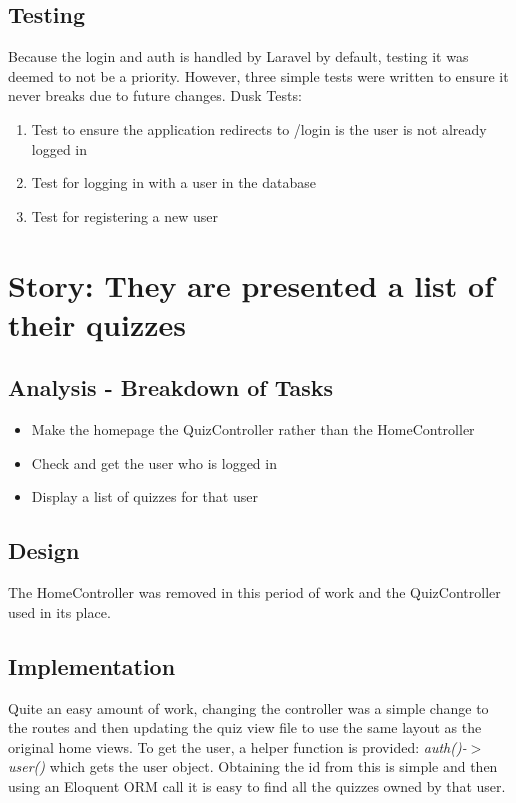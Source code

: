 \documentclass{article}
\begin{document}
\subsection{Testing}
Because the login and auth is handled by Laravel by default, testing it was deemed to not be a priority. However, three simple tests were written to ensure it never breaks due to future changes. Dusk Tests:
\begin{enumerate}
	\item Test to ensure the application redirects to /login is the user is not already logged in
	\item Test for logging in with a user in the database
	\item Test for registering a new user
\end{enumerate}
\newpage

\section{Story: They are presented a list of their quizzes}
\subsection{Analysis - Breakdown of Tasks}
\begin{itemize}
	\item Make the homepage the QuizController rather than the HomeController
	\item Check and get the user who is logged in
	\item Display a list of quizzes for that user
\end{itemize}
\subsection{Design}
The HomeController was removed in this period of work and the QuizController used in its place.
\subsection{Implementation}
Quite an easy amount of work, changing the controller was a simple change to the routes and then updating the quiz view file to use the same layout as the original home views. To get the user, a helper function is provided: \textit{auth()-$>$user()} which gets the user object. Obtaining the id from this is simple and then using an Eloquent ORM call it is easy to find all the quizzes owned by that user.
\end{document}
